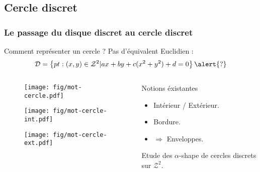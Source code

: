 \documentclass{beamer}
\begin{document}
\subsection{Cercle discret}
\begin{frame}
\frametitle{Le passage du disque discret au cercle discret}

  \begin{block}{Comment représenter un cercle ?}
    Pas d'équivalent Euclidien : 
    \vspace{-0.4cm}
    $$\mathcal{D} =  \left\{ pt : (x,y) \in \mathcal{Z}^{2} |  ax + by + c(x^2 + y^2) + d = 0 \right\} \alert{?} $$ 
  \end{block}
  
  \begin{columns}[t]
    \begin{column}{6cm}
      {
        \begin{figure}[h!]
          \centering
          \texttt{[image: fig/mot-cercle.pdf]}
        \end{figure}
      }
      {
        \begin{figure}[h!]
          \centering
          \texttt{[image: fig/mot-cercle-int.pdf]}
        \end{figure}
      }
      {
        \begin{figure}[h!]
          \centering
          \texttt{[image: fig/mot-cercle-ext.pdf]}
        \end{figure}
      }
    \end{column}

    \begin{column}{5cm}
      \begin{exampleblock}{Notions éxistantes}
       
        \begin{itemize}
          \item Intérieur / Extérieur.
          \item Bordure.
          \item  $\Rightarrow$ Enveloppes.
        \end{itemize}
      \end{exampleblock} 
      {
        \begin{center}  
          \alert{Etude des $\alpha$-shape de cercles discrets sur $\mathcal{Z}^{2}$.}
        \end{center}
      }
    \end{column}
  \end{columns} 
  

\end{frame}
\end{document}

